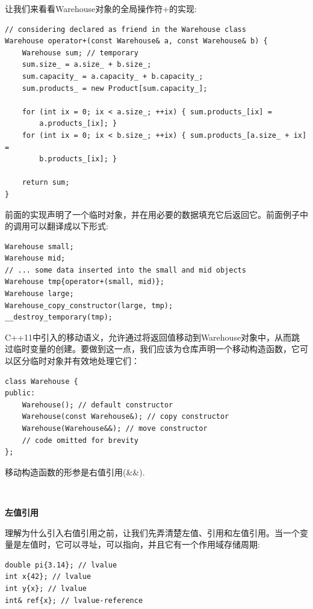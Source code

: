 让我们来看看Warehouse对象的全局操作符+的实现: \par

\begin{lstlisting}[caption={}]
// considering declared as friend in the Warehouse class
Warehouse operator+(const Warehouse& a, const Warehouse& b) {
	Warehouse sum; // temporary
	sum.size_ = a.size_ + b.size_;
	sum.capacity_ = a.capacity_ + b.capacity_;
	sum.products_ = new Product[sum.capacity_];
	
	for (int ix = 0; ix < a.size_; ++ix) { sum.products_[ix] =
		a.products_[ix]; }
	for (int ix = 0; ix < b.size_; ++ix) { sum.products_[a.size_ + ix] =
		b.products_[ix]; }
	
	return sum;
}
\end{lstlisting}

前面的实现声明了一个临时对象，并在用必要的数据填充它后返回它。前面例子中的调用可以翻译成以下形式: \par

\begin{lstlisting}[caption={}]
Warehouse small;
Warehouse mid;
// ... some data inserted into the small and mid objects
Warehouse tmp{operator+(small, mid)};
Warehouse large;
Warehouse_copy_constructor(large, tmp);
__destroy_temporary(tmp);
\end{lstlisting}

C++11中引入的移动语义，允许通过将返回值移动到Warehouse对象中，从而跳过临时变量的创建。要做到这一点，我们应该为仓库声明一个移动构造函数，它可以区分临时对象并有效地处理它们： \par

\begin{lstlisting}[caption={}]
class Warehouse {
public:
	Warehouse(); // default constructor
	Warehouse(const Warehouse&); // copy constructor
	Warehouse(Warehouse&&); // move constructor
	// code omitted for brevity
};
\end{lstlisting}

移动构造函数的形参是右值引用(\&\&). \par

\noindent\textbf{}\ \par
\textbf{左值引用} \ \par
理解为什么引入右值引用之前，让我们先弄清楚左值、引用和左值引用。当一个变量是左值时，它可以寻址，可以指向，并且它有一个作用域存储周期: \par

\begin{lstlisting}[caption={}]
double pi{3.14}; // lvalue
int x{42}; // lvalue
int y{x}; // lvalue
int& ref{x}; // lvalue-reference
\end{lstlisting}

